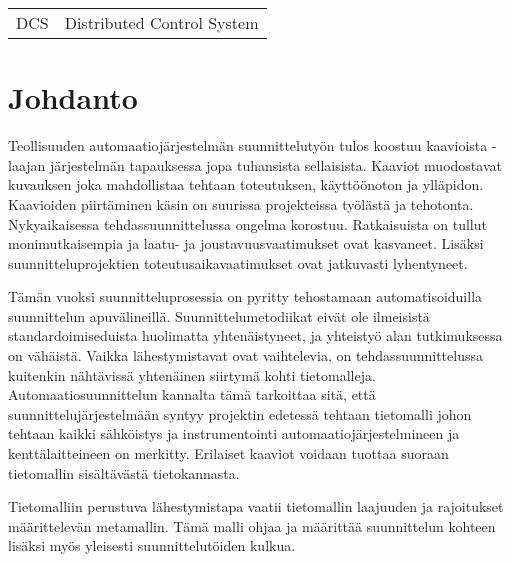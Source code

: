 \documentclass[finnish,12pt]{article}
\begin{document}

	\begin{tabular}{ll}
DCS        & Distributed Control System \\

	\end{tabular}

	\cleardoublepage
	\storeinipagenumber
	\setcounter{page}{1}

	\section{Johdanto}
	\thispagestyle{empty}

Teollisuuden automaatiojärjestelmän suunnittelutyön tulos koostuu kaavioista -
laajan järjestelmän tapauksessa jopa tuhansista sellaisista. Kaaviot muodostavat
kuvauksen joka mahdollistaa tehtaan toteutuksen, käyttöönoton ja ylläpidon.
Kaavioiden piirtäminen käsin on suurissa projekteissa työlästä ja tehotonta.
Nykyaikaisessa tehdassuunnittelussa ongelma korostuu. Ratkaisuista on tullut
monimutkaisempia ja laatu- ja joustavuusvaatimukset ovat kasvaneet. Lisäksi
suunnitteluprojektien toteutusaikavaatimukset ovat jatkuvasti lyhentyneet.
\cite{RefWorks:41}

Tämän vuoksi suunnitteluprosessia on pyritty tehostamaan automatisoiduilla
suunnittelun apuvälineillä. Suunnittelumetodiikat eivät ole
ilmeisistä standardoimiseduista huolimatta yhtenäistyneet, ja yhteistyö alan
tutkimuksessa on vähäistä. Vaikka lähestymistavat ovat vaihtelevia, on
tehdassuunnittelussa kuitenkin nähtävissä yhtenäinen siirtymä kohti 
tietomalleja. Automaatiosuunnittelun kannalta tämä tarkoittaa sitä, että
suunnittelujärjestelmään syntyy projektin edetessä tehtaan
tietomalli johon tehtaan kaikki sähköistys ja instrumentointi
automaatiojärjestelmineen ja kenttälaitteineen on merkitty. Erilaiset kaaviot
voidaan tuottaa suoraan tietomallin sisältävästä tietokannasta.

Tietomalliin perustuva lähestymistapa vaatii tietomallin laajuuden ja rajoitukset
määrittelevän metamallin. Tämä malli ohjaa ja määrittää suunnittelun kohteen lisäksi
myös yleisesti suunnittelutöiden kulkua.
\end{document}
